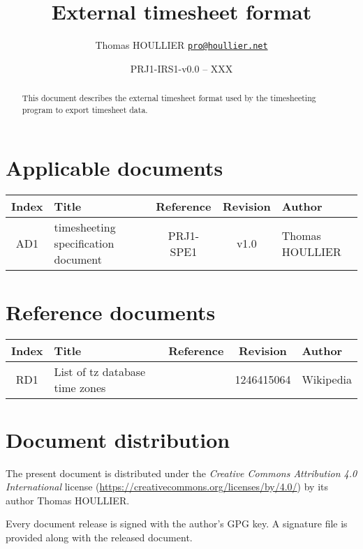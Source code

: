 \documentclass[letterpaper]{article}
\title{External timesheet format}
\author{Thomas HOULLIER \href{mailto:pro@houllier.net}
         {\texttt{\textlangle pro@houllier.net\textrangle}}}
\begin{document}
\frenchspacing
\date{PRJ1-IRS1-v0.0 -- XXX}
\maketitle
\thispagestyle{FirstPage}

\begin{abstract}
  This document describes the external timesheet format used by the
  timesheeting program to export timesheet data.
\end{abstract}

\begin{versionhistory}
\end{versionhistory}
\setcounter{table}{0} %

\section*{Applicable documents}
{ \centering
  \begin{tabularx}{\textwidth}{| c | X | c | c | X |} \hline
    Index & Title & Reference & Revision & Author \\ \hline
    AD1 & timesheeting specification document & PRJ1-SPE1 & v1.0 & Thomas
    HOULLIER \\ \hline
  \end{tabularx} \par }

\section*{Reference documents}
{ \centering
  \begin{tabularx}{\textwidth}{| c | X | c | c | X |} \hline
    Index & Title & Reference & Revision & Author \\ \hline
    RD1 & List of tz database time zones &
    \cite{wiki:tz_list} & 1246415064 & Wikipedia \\ \hline
  \end{tabularx} \par }

\section*{Document distribution}
The present document is distributed under the \emph{Creative Commons Attribution
  4.0 International} license (\url{https://creativecommons.org/licenses/by/4.0/})
by its author Thomas HOULLIER.

Every document release is signed with the author's GPG key. A signature file
is provided along with the released document.

\tableofcontents
\printglossary[type=\acronymtype,style=index]
\pagestyle{plain}





\appendix


\apptocmd{\thebibliography}{\raggedright}{}{}
\begingroup
{}
\setlength\bibitemsep{0pt}
\printbibliography
\endgroup
\end{document}
